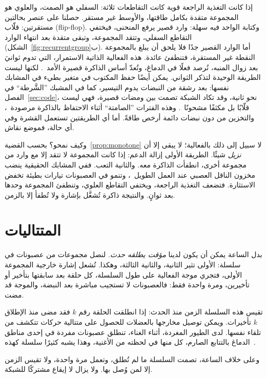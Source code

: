إذا كانت التغذية الراجعة قوية كانت التقاطعات ثلاثة: السفلي هو الصمت، والعلوي هو المجموعة متقدة بكامل طاقتها، والأوسط غير مستقر. حصلنا على عنصر بحالتين مستقرتين: قلّاب (\foreignlanguage{english}{flip-flop}). وكتابة الواحد فيه سهلة: وارد قصير يرفع المنحنى، فيختفي التقاطع السفلي، وتتقد المجموعة، وتبقى متقدة بعد انتهاء الوارد (الشكل~\ref{fig:recurrentgroup}ب). أما الوارد القصير جدًا فلا يلحق أن يبلغ بالمجموعة النقطة غير المستقرة، فتنطفئ عائدة. هذه الفعالية الذاتية الاستمرار، التي تدوم ثوانيَ بعد زوال المنبه، تُرصد فعلًا في الدماغ، وتُعدّ أساس الذاكرة قصيرة الأمد~\cite{Wang2001}. لكنها ليست الطريقة الوحيدة لتذكر الثواني. يمكن أيضًا حفظ المكتوب في متغير بطيء في المشابك نفسها: بعد رشقة من النبضات يدوم التيسير، كما في المشبك ”الشَّرطة“ في الفصل~\ref{sec:code}، نحو ثانية، وقد تكاد الشبكة تصمت بين ومضات قصيرة، فهي ليست قلّابًا بل مكثفًا مشحونًا~\cite{Mongillo2008}. وهذه الفترات ”الصامتة“ أثناء الاحتفاظ بالذاكرة مرصودة~\cite{Stokes2015}، والتخزين من دون نبضات دائمة أرخص طاقةً. أما أي الطريقتين تستعمل القشرة وفي أي حالة، فموضع نقاش.

وكيف نمحو؟ بحسب القضية~\ref{prop:monotone} لا سبيل إلى ذلك بالفعالية؛ لا يبقى إلا أن \emph{نزيل} شيئًا. الطريقة الأولى إزالة الدعم: إذا كانت المجموعة لا تتقد إلا مع وارد من مجموعة أخرى، انطفأت الذاكرة معه. والثانية التعب. ففي المشابك الحقيقية ينضب مخزون الناقل العصبي عند العمل الطويل~\cite{Tsodyks1997}، وتنمو في العصبونات تيارات بطيئة تخفض الاستثارة. فتضعف التغذية الراجعة، ويختفي التقاطع العلوي، وتنطفئ المجموعة وحدها بعد ثوانٍ. والنتيجة ذاكرة تُشغَّل بإشارة ولا تُطفأ إلا بالزمن.

\section{المتتاليات}

بدل الساعة يمكن أن يكون لدينا \emph{مؤقت يطلقه حدث}. لنصل مجموعات من عصبونات  في سلسلة: الأولى تثير الثانية، والثانية الثالثة، وهكذا. تُشعل إشارة خارجية المجموعة الأولى، فتجري موجة الفعالية على طول السلسلة، كل حلقة بعد سابقتها بتأخير أو تأخيرين، ومرة واحدة فقط: فالعصبونات لا تستجيب مباشرة بعد النبضة، والموجة قد مضت.

تقيس هذه السلسلة الزمن منذ الحدث: إذا انطلقت الحلقة رقم $k$ فقد مضى منذ الإطلاق $k$ تأخيرات. ويمكن توصيل مخارجها بالعضلات للحصول على متتالية حركات تتكشف من تلقاء نفسها. لدى الطيور المغردة، أثناء الغناء، تنطلق عصبونات  مفردة في إحدى مناطق الدماغ بالتتابع الصارم، كل منها في لحظته من الأغنية، وهذا يشبه كثيرًا سلسلة كهذه~\cite{Hahnloser2002}.

وعلى خلاف الساعة، تصمت السلسلة ما لم تُطلق، وتعمل مرة واحدة، ولا تقيس الزمن إلا لمن وُصل بها. ولا يزال لا إيقاع مشتركًا للشبكة.

